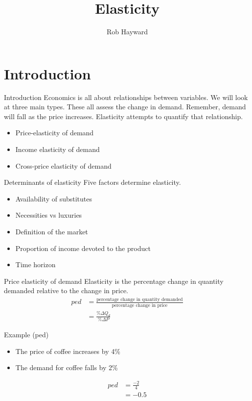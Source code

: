 \documentclass[14pt,xcolor=pdftex,dvipsnames,table]{beamer}\usepackage[]{graphicx}\usepackage[]{color}
\title{Elasticity}
\author{Rob Hayward}
\begin{document}
\begin{frame}
\titlepage
\end{frame}


\section{Introduction}
\begin{frame}{Introduction}
Economics is all about relationships between variables.  We will look at three main types.  These all assess the change in demand.  Remember, demand will fall as the price increases.  Elasticity attempts to quantify that relationship.
\begin{itemize}[<+-| alert@+>]
\item Price-elasticity of demand
\item Income elasticity of demand
\item Cross-price elasticity of demand
\end{itemize}
\end{frame}

\begin{frame}{Determinants of elasticity}
Five factors determine elasticity.
\begin{itemize}[<+-| alert@+>]
\item Availability of substitutes
\item Necessities vs luxuries
\item Definition of the market
\item Proportion of income devoted to the product
\item Time horizon
\end{itemize}
\end{frame}

\begin{frame}{Price elasticity of demand}
Elasticity is the percentage change in quantity demanded relative to the change in price.
\begin{align*}
ped &= \frac{\text{percentage change in quantity demanded}}{\text{percentage change in price}}\\
      & = \frac{\%\Delta Q_d}{\%\Delta P}
\end{align*}
\end{frame}

\begin{frame}{Example (ped)}
\begin{itemize}[<+-| alert@+>]
\item The price of coffee increases by 4\%
\item The demand for coffee falls by 2\%
\end{itemize}
\pause
\begin{align*}
ped &= \frac{-2}{4}\\
&= -0.5
\end{align*}
\end{frame}
\end{document}
